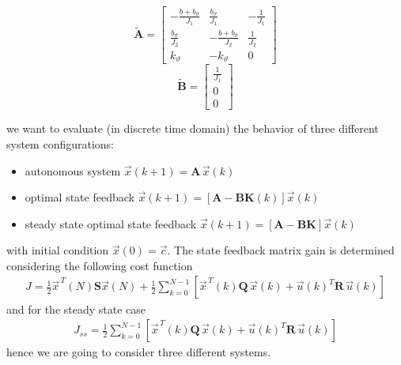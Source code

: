 \documentclass[11pt,a4paper,oneside]{book}
\numberwithin{equation}{section}
\theoremstyle{it}
\theoremstyle{definition}
\begin{document}
\begin{mybox}
	\begin{equation*}
		\tilde{\mathbf{A}} =
		\begin{bmatrix}
			-\frac{b+b_{\vartheta}}{J_1} & \frac{b_{\vartheta}}{J_1} & 
			-\frac{1}{J_1}\\[6pt]
			\frac{b_{\vartheta}}{J_2} & -\frac{b+b_{\vartheta}}{J_2} & 
			\frac{1}{J_2}\\[6pt]
			k_{\vartheta} & -k_{\vartheta} & 0
		\end{bmatrix}
	\end{equation*}
	\begin{equation*}
		\tilde{\mathbf{B}} = 
		\begin{bmatrix}
			\frac{1}{J_1} \\[6pt]
			0 \\[6pt]
			0
		\end{bmatrix}
	\end{equation*}
\end{mybox}

we want to evaluate (in discrete time domain) the behavior of three different 
system configurations:
\begin{itemize}
	\item autonomous system $\vec{x}(k+1)=\mathbf{A}\,\vec{x}(k)$
	\item optimal state feedback $\vec{x}(k+1)=\left[ 
	\mathbf{A}-\mathbf{B}\mathbf{K}(k)\right] \vec{x}(k) $
	\item steady state optimal state feedback $\vec{x}(k+1)=\left[ 
	\mathbf{A}-\mathbf{B}\mathbf{K}\right] \vec{x}(k) $
\end{itemize}
with initial condition $\vec{x}(0)=\vec{c}$. The state feedback matrix gain is 
determined  considering the following cost function
\begin{equation*}
	\begin{aligned}
		J = 
		\frac{1}{2}\vec{x}^{\,T}(N)\mathbf{S}\vec{x}(N)+\frac{1}{2}\sum_{k=0}^{N-1}\left[
		\vec{x}^{\,T}(k)\mathbf{Q}\,\vec{x}(k) + 
		\vec{u}(k)^T\mathbf{R}\,\vec{u}(k)\right]  
	\end{aligned}
\end{equation*}
and for the steady state case
\begin{equation*}
	\begin{aligned}
		J_{ss} = \frac{1}{2}\sum_{k=0}^{N-1}\left[ 
		\vec{x}^{\,T}(k)\mathbf{Q}\,\vec{x}(k) + 
		\vec{u}(k)^T\mathbf{R}\,\vec{u}(k)\right]  
	\end{aligned}
\end{equation*}
hence we are going to consider three different systems.
\vspace{10mm}
\end{document}
